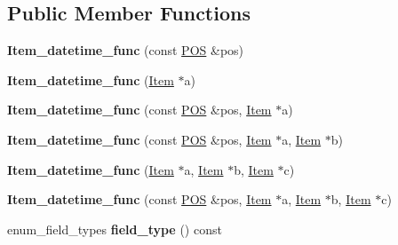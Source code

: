 \subsection*{Public Member Functions}
\begin{DoxyCompactItemize}
\item 
\mbox{\label{classItem__datetime__func_a1e48d0497fb58ba952370b2c5a8855d2}} 
{\bfseries Item\+\_\+datetime\+\_\+func} (const \mbox{\hyperlink{structYYLTYPE}{P\+OS}} \&pos)
\item 
\mbox{\label{classItem__datetime__func_a1957110e2219a2869336bc50d84ac010}} 
{\bfseries Item\+\_\+datetime\+\_\+func} (\mbox{\hyperlink{classItem}{Item}} $\ast$a)
\item 
\mbox{\label{classItem__datetime__func_af0ee594743f82148200161af903a2f7b}} 
{\bfseries Item\+\_\+datetime\+\_\+func} (const \mbox{\hyperlink{structYYLTYPE}{P\+OS}} \&pos, \mbox{\hyperlink{classItem}{Item}} $\ast$a)
\item 
\mbox{\label{classItem__datetime__func_ad3eea6c686b26a94cffda847f9be8b8d}} 
{\bfseries Item\+\_\+datetime\+\_\+func} (const \mbox{\hyperlink{structYYLTYPE}{P\+OS}} \&pos, \mbox{\hyperlink{classItem}{Item}} $\ast$a, \mbox{\hyperlink{classItem}{Item}} $\ast$b)
\item 
\mbox{\label{classItem__datetime__func_aaaef40f37d6aef64c4c2198ad4d88d20}} 
{\bfseries Item\+\_\+datetime\+\_\+func} (\mbox{\hyperlink{classItem}{Item}} $\ast$a, \mbox{\hyperlink{classItem}{Item}} $\ast$b, \mbox{\hyperlink{classItem}{Item}} $\ast$c)
\item 
\mbox{\label{classItem__datetime__func_ab7a9187d3a13ce83488209b3e48ab10c}} 
{\bfseries Item\+\_\+datetime\+\_\+func} (const \mbox{\hyperlink{structYYLTYPE}{P\+OS}} \&pos, \mbox{\hyperlink{classItem}{Item}} $\ast$a, \mbox{\hyperlink{classItem}{Item}} $\ast$b, \mbox{\hyperlink{classItem}{Item}} $\ast$c)
\item 
\mbox{\label{classItem__datetime__func_ae7635e5ffe3dd129a7ac0595da7e456d}} 
enum\+\_\+field\+\_\+types {\bfseries field\+\_\+type} () const

\end{DoxyCompactItemize}
